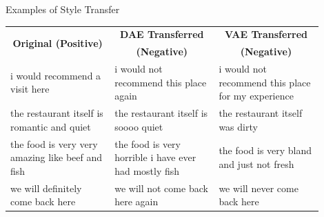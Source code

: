 \documentclass[aspectratio=169]{beamer}
\newcommand{\tabh}[1]{\multicolumn{1}{c|}{\textbf{#1}}}
\newcommand{\tabc}[2]{\multicolumn{1}{|c||}{\multirow{#1}{*}{\textbf{#2}}}}
\begin{document}
\begin{frame}{Examples of Style Transfer}
	\centering
	\begin{table}[ht]
		\centering
		\begin{tabular}{| p{0.3\linewidth} || p{0.3\linewidth} | p{0.3\linewidth} |}
			\hline
			\tabc{2}{Original (Positive)}                    & \tabh{DAE Transferred}                                & \tabh{VAE Transferred}                             \\
			                                                 & \tabh{(Negative)}                                     & \tabh{(Negative)}                                  \\
			\hline
			\hline
			i would recommend a visit here                   & i would not recommend this place again                & i would not recommend this place for my experience \\
			\hline
			the restaurant itself is romantic and quiet      & the restaurant itself is soooo quiet                  & the restaurant itself was dirty                    \\
			\hline
			the food is very very amazing like beef and fish & the food is very horrible i have ever had mostly fish & the food is very bland and just not fresh          \\
			\hline
			we will definitely come back here                & we will not come back here again                      & we will never come back here                       \\
			\hline
		\end{tabular}
	\end{table}
\end{frame}
\end{document}
